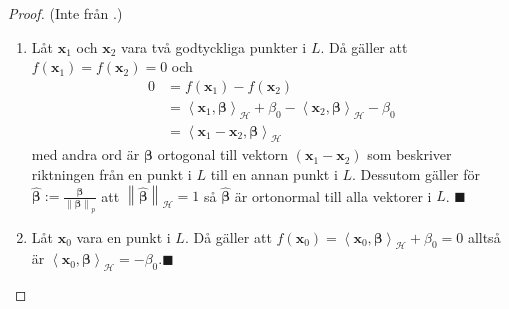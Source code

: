 \documentclass[a4paper, 12pt]{report}
\theoremstyle{definition}
\theoremstyle{remark}
\newcommand{\bfbeta}{{\boldsymbol{\beta}}}
\renewcommand\qedsymbol{$\blacksquare$}
\newcommand{\bfx}{\mathbf{x}}
\newcommand{\llangle}{\left\langle}
\newcommand{\rrangle}{\right\rangle}
\newcommand{\inner}[2]{\llangle #1, #2 \rrangle}
\newcommand{\hil}{\mathcal{H}}
\begin{document}
\begin{proof} (Inte från \cite{ESL}.)
	\leavevmode
\begin{enumerate}
	\item Låt $\mathbf{x}_1$ och $\mathbf{x}_2$ vara två godtyckliga punkter i $L$. Då gäller att $f\left(\mathbf{x}_1\right)=f\left(\mathbf{x}_2\right)=0$ och
	\begin{align*}
		0 &= f\left(\mathbf{x}_1\right)-f\left(\mathbf{x}_2\right)\\
		&= \inner{\bfx_1}{\bfbeta}_\hil + \beta_0 - \inner{\bfx_2}{\bfbeta}_\hil - \beta_0\\
		&= \inner{\mathbf{x}_1-\mathbf{x}_2}{\bfbeta}_\hil
	\end{align*}
	med andra ord är $\bfbeta$ ortogonal till vektorn $\left(\mathbf{x}_1-\mathbf{x}_2\right)$ som beskriver riktningen från en punkt i $L$ till en annan punkt i $L$.
	Dessutom gäller för $\widehat{\bfbeta}:=\frac{\bfbeta}{\left\|\bfbeta
	\right\|_p}$ att $\left\|\widehat{\bfbeta}\right\|_\hil=1$ så $\widehat{\bfbeta}$ är ortonormal till alla vektorer i $L$. \hfill\qedsymbol

	\item \label{eq:egenskap2}Låt $\mathbf{x}_0$ vara en punkt i $L$. Då gäller att $f\left(\mathbf{x}_0\right)=\inner{\bfx_0}{\bfbeta}_\hil + \beta_0 = 0$ alltså är $\inner{\bfx_0}{\bfbeta}_\hil = - \beta_0$.\hfill \qedsymbol
	

\end{enumerate}
\end{proof}
\end{document}
